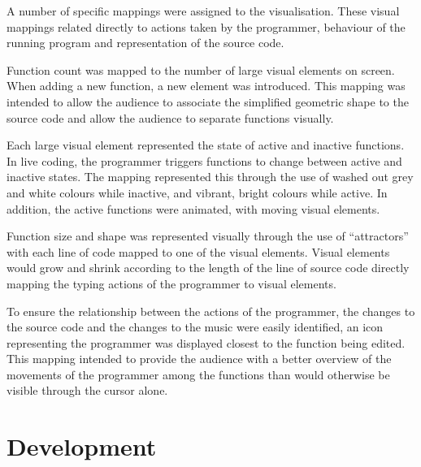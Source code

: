 A number of specific mappings were assigned to the visualisation. These visual mappings related directly to actions taken by the programmer, behaviour of the running program and representation of the source code. 

Function count was mapped to the number of large visual elements on screen. When adding a new function, a new element was introduced. This mapping was intended to allow the audience to associate the simplified geometric shape to the source code and allow the audience to separate functions visually.

Each large visual element represented the state of active and inactive functions. In live coding, the programmer triggers functions to change between active and inactive states. The mapping represented this through the use of washed out grey and white colours while inactive, and vibrant, bright colours while active. In addition, the active functions were animated, with moving visual elements.

Function size and shape was represented visually through the use of ``attractors'' with each line of code mapped to one of the visual elements. Visual elements would grow and shrink according to the length of the line of source code directly mapping the typing actions of the programmer to visual elements.  


To ensure the relationship between the actions of the programmer, the changes to the source code and the changes to the music were easily identified, an icon representing the programmer was displayed closest to the function being edited. This mapping intended to provide the audience with a better overview of the movements of the programmer among the functions than would otherwise be visible through the cursor alone.  





\section{Development}

